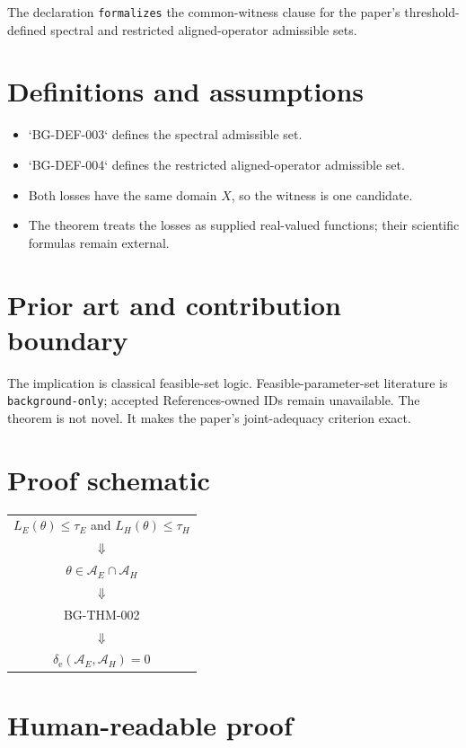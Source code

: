 \documentclass[11pt]{article}
\begin{document}
The declaration \texttt{formalizes} the common-witness clause for the paper's
threshold-defined spectral and restricted aligned-operator admissible sets.

\section{Definitions and assumptions}

\begin{itemize}
 \item `BG-DEF-003` defines the spectral admissible set.
 \item `BG-DEF-004` defines the restricted aligned-operator admissible set.
 \item Both losses have the same domain $X$, so the witness is one candidate.
 \item The theorem treats the losses as supplied real-valued functions; their scientific formulas remain external.
\end{itemize}

\section{Prior art and contribution boundary}

The implication is classical feasible-set logic. Feasible-parameter-set literature is
\texttt{background-only}; accepted References-owned IDs remain unavailable. The theorem
is not novel. It makes the paper's joint-adequacy criterion exact.

\section{Proof schematic}

\begin{center}
\begin{tabular}{c}
$L_E(\theta)\le\tau_E$ and $L_H(\theta)\le\tau_H$ \\
$\Downarrow$ \\
$\theta\in\mathcal A_E\cap\mathcal A_H$ \\
$\Downarrow$ \\
BG-THM-002 \\
$\Downarrow$ \\
$\delta_{\mathrm e}(\mathcal A_E,\mathcal A_H)=0$
\end{tabular}
\end{center}

\section{Human-readable proof}
\end{document}
